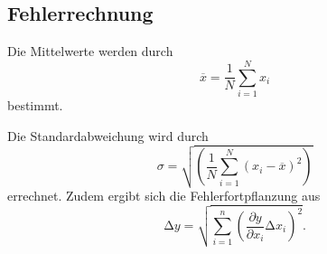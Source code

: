 \subsection{Fehlerrechnung}

Die Mittelwerte werden durch
\begin{equation}
  \overline{x} =\frac{1}{N}\sum_{i=1}^{N} x_i
  \label{eqn:mean}
\end{equation}
bestimmt.

Die Standardabweichung wird durch
\begin{equation}
  \sigma = \sqrt{\left(\frac{1}{N}\sum_{i=1}^{N}(x_i-\overline{x})^2\right)}
  \label{eqn:std}
\end{equation}
 errechnet.
 Zudem ergibt sich die Fehlerfortpflanzung aus
 \begin{equation}
   \increment y = \sqrt{\sum_{i=1}^{n}\left(\frac{\partial y}{\partial x_i}
   \increment x_i\right)^2}
   \label{eqn:gauss}.
\end{equation}
